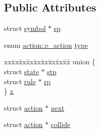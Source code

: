 \subsection*{Public Attributes}
\begin{DoxyCompactItemize}
\item 
struct \hyperlink{structsymbol}{symbol} $\ast$ \hyperlink{structaction_a8bb419de6aa7116057d284c32003e623}{sp}
\item 
enum \hyperlink{structaction_a03e1ad674211aa3a02d2ceeb227684ff}{action\-::e\-\_\-action} \hyperlink{structaction_a0f5ddfb1ec3fc9f2da9f2c707defbe0d}{type}
\item 
\begin{tabbing}
xx\=xx\=xx\=xx\=xx\=xx\=xx\=xx\=xx\=\kill
union \{\\
\>struct \hyperlink{structstate}{state} $\ast$ \hyperlink{structaction_a5642dd2fd42e8fcd1dbe242e7a9386ce}{stp}\\
\>struct \hyperlink{structrule}{rule} $\ast$ \hyperlink{structaction_af3ef54d83f6ee6fabe6200fff85e60be}{rp}\\
\} \hyperlink{structaction_ac107dc4c91dd2415581d1f1264ccc92b}{x}\\

\end{tabbing}\item 
struct \hyperlink{structaction}{action} $\ast$ \hyperlink{structaction_ac28cb9e021b566c2a6ce19f1a3351a57}{next}
\item 
struct \hyperlink{structaction}{action} $\ast$ \hyperlink{structaction_ac7927e28b23531ef0e799d618debc9bb}{collide}
\end{DoxyCompactItemize}


